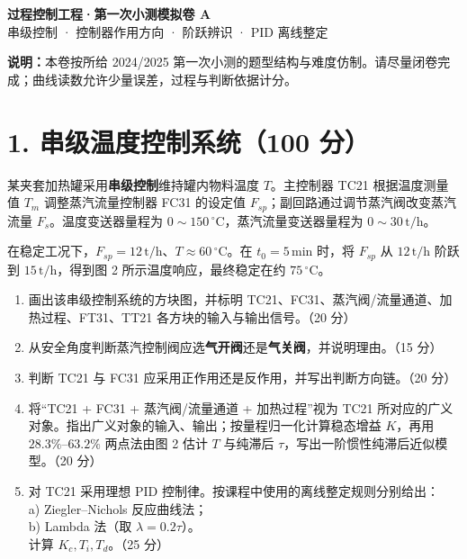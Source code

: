 \documentclass[UTF8,a4paper,11pt]{ctexart}
\begin{document}
\begin{center}
{\LARGE\bfseries 过程控制工程·第一次小测模拟卷 A}\\[4pt]
{\large 串级控制 · 控制器作用方向 · 阶跃辨识 · PID 离线整定}
\end{center}

\vspace{2mm}
\noindent\colorbox{soft}{\parbox{0.94\linewidth}{\textbf{说明：}本卷按所给 2024/2025 第一次小测的题型结构与难度仿制。请尽量闭卷完成；曲线读数允许少量误差，过程与判断依据计分。}}

\section*{1. 串级温度控制系统（100 分）}
某夹套加热罐采用\textbf{串级控制}维持罐内物料温度 $T$。主控制器 TC21 根据温度测量值 $T_m$ 调整蒸汽流量控制器 FC31 的设定值 $F_{sp}$；副回路通过调节蒸汽阀改变蒸汽流量 $F_s$。温度变送器量程为 $0\sim150\,^{\circ}\mathrm C$，蒸汽流量变送器量程为 $0\sim30\,\mathrm{t/h}$。

在稳定工况下，$F_{sp}=12\,\mathrm{t/h}$、$T\approx60\,^{\circ}\mathrm C$。在 $t_0=5\,\mathrm{min}$ 时，将 $F_{sp}$ 从 $12\,\mathrm{t/h}$ 阶跃到 $15\,\mathrm{t/h}$，得到图 2 所示温度响应，最终稳定在约 $75\,^{\circ}\mathrm C$。

\begin{enumerate}[label=\textbf{(\arabic*)},leftmargin=2.2em,itemsep=4pt]
\item[\textbf{(1)}] 画出该串级控制系统的方块图，并标明 TC21、FC31、蒸汽阀/流量通道、加热过程、FT31、TT21 各方块的输入与输出信号。（20 分）
\item[\textbf{(2)}] 从安全角度判断蒸汽控制阀应选\textbf{气开阀}还是\textbf{气关阀}，并说明理由。（15 分）
\item[\textbf{(3)}] 判断 TC21 与 FC31 应采用正作用还是反作用，并写出判断方向链。（20 分）
\item[\textbf{(4)}] 将“TC21 + FC31 + 蒸汽阀/流量通道 + 加热过程”视为 TC21 所对应的广义对象。指出广义对象的输入、输出；按量程归一化计算稳态增益 $K$，再用 $28.3\%$--$63.2\%$ 两点法由图 2 估计 $T$ 与纯滞后 $\tau$，写出一阶惯性纯滞后近似模型。（20 分）
\item[\textbf{(5)}] 对 TC21 采用理想 PID 控制律。按课程中使用的离线整定规则分别给出：\\
\quad a) Ziegler--Nichols 反应曲线法；\\
\quad b) Lambda 法（取 $\lambda=0.2\tau$）。\\
计算 $K_c,T_i,T_d$。（25 分）
\end{enumerate}
\end{document}
